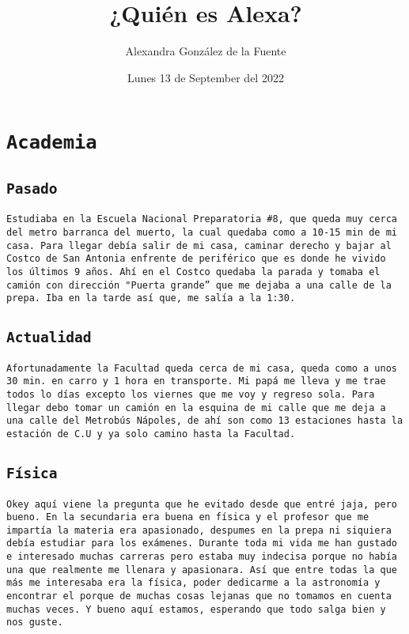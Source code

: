 \documentclass[12pt, letterpaper]{article}
\title{¿Quién es Alexa?}
\author{Alexandra González de la Fuente  }
\date{Lunes 13 de September del 2022}
\begin{document}
\maketitle

\section{\tt\huge{Academia}}

\subsection{\tt{Pasado}}
\tt{Estudiaba en la Escuela Nacional Preparatoria \#8, que queda muy cerca del metro barranca del muerto, la cual quedaba como a 10-15 min de mi casa. Para llegar debía salir de mi casa, caminar derecho y bajar al Costco de San Antonia enfrente de periférico que es donde he vivido los últimos 9 años. Ahí en el Costco quedaba la parada y tomaba el camión con dirección "Puerta grande” que me dejaba a una calle de la prepa. Iba en la tarde así que, me salía a la 1:30.}

\subsection{\tt{Actualidad}}
\tt{Afortunadamente la Facultad queda cerca de mi casa, queda como a unos 30 min. en carro y 1 hora en transporte. Mi papá me lleva y me trae todos lo días excepto los viernes que me voy y regreso sola. Para llegar debo tomar un camión en la esquina de mi calle que me deja a una calle del Metrobús Nápoles, de ahí son como 13 estaciones hasta la estación de C.U y ya solo camino hasta la Facultad.}

\subsection{\tt{Física}}
\tt{Okey aquí viene la pregunta que he evitado desde que entré jaja, pero bueno. En la secundaria era buena en física y el profesor que me impartía la materia era apasionado, despumes en la prepa ni siquiera debía estudiar para los exámenes. Durante toda mi vida me han gustado e interesado muchas carreras pero estaba muy indecisa porque no había una que realmente me llenara y apasionara. Así que entre todas la que más me interesaba era la física, poder dedicarme a la astronomía y encontrar el porque de muchas cosas lejanas que no tomamos en cuenta muchas veces. Y bueno aquí estamos, esperando que todo salga bien y nos guste. }
\end{document}
